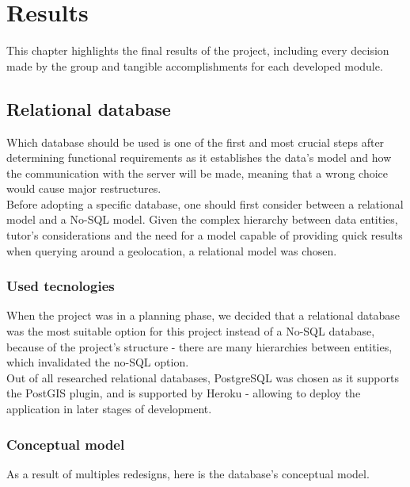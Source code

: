 %
%
\chapter{Results}

This chapter highlights the final results of the project,
including every decision made by the group and tangible accomplishments for each developed module.\\

\section{Relational database}

Which database should be used is one of the first and most
crucial steps after determining functional requirements 
as it establishes the data's model and how the communication
with the server will be made, meaning that a wrong choice
would cause major restructures.\\

Before adopting a specific database, one should first
consider between a relational model and a No-SQL model. 
Given the complex hierarchy between data entities,
tutor's considerations and the need for a model capable of 
providing quick results when querying around a geolocation, 
a relational model was chosen.

\subsection{Used tecnologies}

When the project was in a planning phase, we decided that a relational database was the most suitable option for this project
instead of a No-SQL database, because of the project's structure - there are many hierarchies between entities, which invalidated the
no-SQL option.\\

Out of all researched relational databases, 
PostgreSQL was chosen as it supports the PostGIS\cite{postGIS} plugin, and 
is supported by Heroku - allowing to 
deploy the application in later stages of development.\\

\subsection{Conceptual model}
As a result of multiples redesigns, here is the database's conceptual model.

